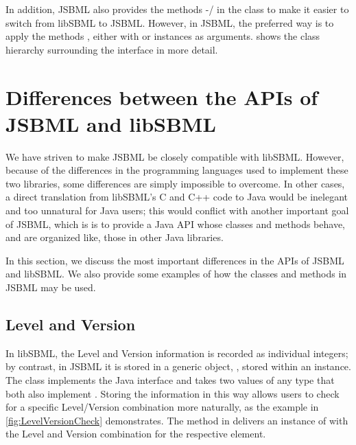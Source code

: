 In addition, JSBML also provides the methods
-/ in the \InitialAssignment class
to make it easier to switch from libSBML to JSBML.  However, in JSBML, the
preferred way  is to apply the
methods , either with \String or \Variable instances as
arguments.   shows the class
hierarchy surrounding the \Assignment interface in more detail.


\section{Differences between the APIs of JSBML and libSBML}
\label{sec:api-differences}

We have striven to make JSBML be closely compatible with libSBML. However,
because of the differences in the programming languages used to implement
these two libraries, some differences are simply impossible to overcome.
In other cases, a direct translation from libSBML's C and C++ 
code to Java would be inelegant and too unnatural for Java users; this
would conflict with another important goal of JSBML, which is is to provide
a Java API  whose classes and
methods behave, and are organized like, those in other Java libraries.

In this section, we discuss the most important differences in the APIs of
JSBML  and libSBML.
 We also provide some
examples of how the classes and methods in JSBML may be used.

\subsection{Level and Version }

In libSBML, the Level and Version information is recorded as individual
integers; by contrast, in JSBML it is stored in a generic object, \ValuePair,
stored within an \AbstractSBase instance. The class \ValuePair implements the
Java interface \Comparable and takes two values of any type that both also
implement \Comparable.  Storing the information in this way allows users to
check for a specific Level/Version combination more naturally, as the example
in \vref{fig:LevelVersionCheck} demonstrates. The method
 in \AbstractSBase delivers an instance of
\ValuePair with the Level and Version combination for the respective element.

